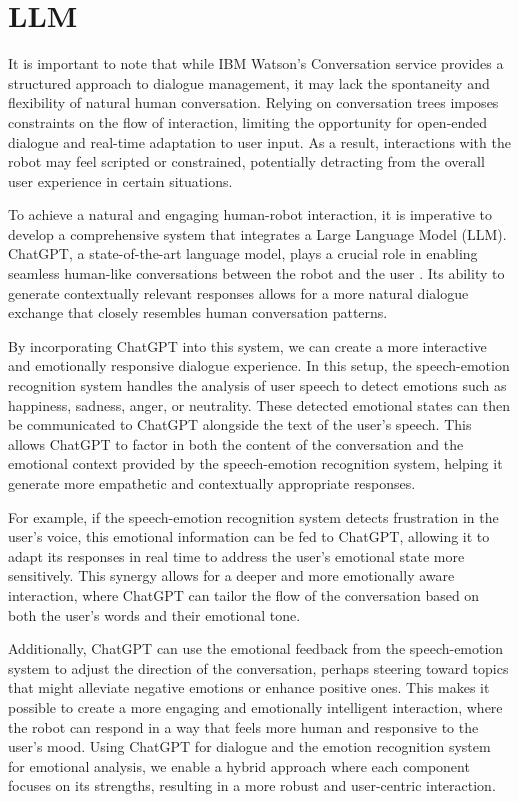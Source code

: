 \section{LLM}

It is important to note that while IBM Watson's Conversation service provides a structured approach to dialogue management, it may lack the spontaneity and flexibility of natural human conversation. Relying on conversation trees imposes constraints on the flow of interaction, limiting the opportunity for open-ended dialogue and real-time adaptation to user input. As a result, interactions with the robot may feel scripted or constrained, potentially detracting from the overall user experience in certain situations.

To achieve a natural and engaging human-robot interaction, it is imperative to develop a comprehensive system that integrates a Large Language Model (LLM). ChatGPT, a state-of-the-art language model, plays a crucial role in enabling seamless human-like conversations between the robot and the user \cite{chatgpt}. Its ability to generate contextually relevant responses allows for a more natural dialogue exchange that closely resembles human conversation patterns.

By incorporating ChatGPT into this system, we can create a more interactive and emotionally responsive dialogue experience. In this setup, the speech-emotion recognition system handles the analysis of user speech to detect emotions such as happiness, sadness, anger, or neutrality. These detected emotional states can then be communicated to ChatGPT alongside the text of the user's speech. This allows ChatGPT to factor in both the content of the conversation and the emotional context provided by the speech-emotion recognition system, helping it generate more empathetic and contextually appropriate responses.

For example, if the speech-emotion recognition system detects frustration in the user's voice, this emotional information can be fed to ChatGPT, allowing it to adapt its responses in real time to address the user’s emotional state more sensitively. This synergy allows for a deeper and more emotionally aware interaction, where ChatGPT can tailor the flow of the conversation based on both the user’s words and their emotional tone.

Additionally, ChatGPT can use the emotional feedback from the speech-emotion system to adjust the direction of the conversation, perhaps steering toward topics that might alleviate negative emotions or enhance positive ones. This makes it possible to create a more engaging and emotionally intelligent interaction, where the robot can respond in a way that feels more human and responsive to the user's mood. Using ChatGPT for dialogue and the emotion recognition system for emotional analysis, we enable a hybrid approach where each component focuses on its strengths, resulting in a more robust and user-centric interaction.

